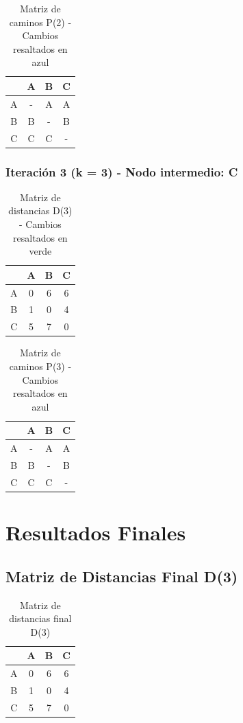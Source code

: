 \documentclass[12pt]{article}
\begin{document}
\begin{table}[h!]
\centering
\begin{tabular}{|c|c|c|c|}
\hline
 & A & B & C \\\hline
A & - & A & A \\\hline
B & B & - & B \\\hline
C & C & C & - \\\hline
\end{tabular}
\caption{Matriz de caminos P(2) - Cambios resaltados en azul}
\end{table}

\clearpage
\subsubsection{Iteración 3 (k = 3) - Nodo intermedio: C}
\begin{table}[h!]
\centering
\begin{tabular}{|c|c|c|c|}
\hline
 & A & B & C \\\hline
A & 0 & 6 & 6 \\\hline
B & 1 & 0 & 4 \\\hline
C & 5 & 7 & 0 \\\hline
\end{tabular}
\caption{Matriz de distancias D(3) - Cambios resaltados en verde}
\end{table}

\begin{table}[h!]
\centering
\begin{tabular}{|c|c|c|c|}
\hline
 & A & B & C \\\hline
A & - & A & A \\\hline
B & B & - & B \\\hline
C & C & C & - \\\hline
\end{tabular}
\caption{Matriz de caminos P(3) - Cambios resaltados en azul}
\end{table}

\clearpage
\section{Resultados Finales}
\subsection{Matriz de Distancias Final D(3)}
\begin{table}[h!]
\centering
\begin{tabular}{|c|c|c|c|}
\hline
 & A & B & C \\\hline
A & 0 & 6 & 6 \\\hline
B & 1 & 0 & 4 \\\hline
C & 5 & 7 & 0 \\\hline
\end{tabular}
\caption{Matriz de distancias final D(3)}
\end{table}
\end{document}
